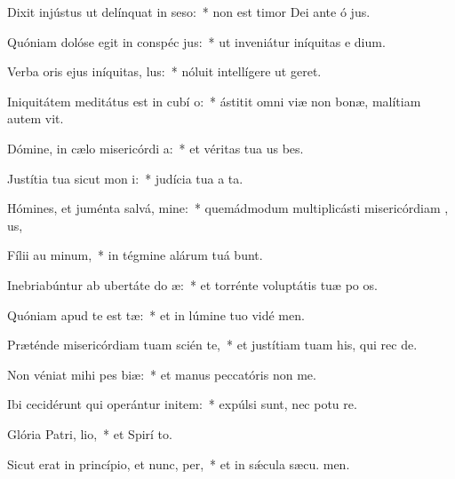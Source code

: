 \item Dixit injústus ut delínquat in seso:~* non est timor Dei ante ó jus.
\item Quóniam dolóse egit in conspéc jus:~* ut inveniátur iníquitas e  dium.
\item Verba oris ejus iníquitas,  lus:~* nóluit intellígere ut  geret.
\item Iniquitátem meditátus est in cubí o:~* ástitit omni viæ non bonæ, malítiam autem  vit.
\item Dómine, in cælo misericórdi a:~* et véritas tua us  bes.
\item Justítia tua sicut mon i:~* judícia tua a ta.
\item Hómines, et juménta salvá, mine:~* quemádmodum multiplicásti misericórdiam , us,
\item Fílii au minum,~* in tégmine alárum tuá bunt.
\item Inebriabúntur ab ubertáte do æ:~* et torrénte voluptátis tuæ po os.
\item Quóniam apud te est  tæ:~* et in lúmine tuo vidé men.
\item Præténde misericórdiam tuam scién te,~* et justítiam tuam his, qui rec  de.
\item Non véniat mihi pes biæ:~* et manus peccatóris non  me.
\item Ibi cecidérunt qui operántur initem:~* expúlsi sunt, nec potu re.
\item Glória Patri,  lio,~* et Spirí to.
\item Sicut erat in princípio, et nunc,  per,~* et in sǽcula sæcu. men.
